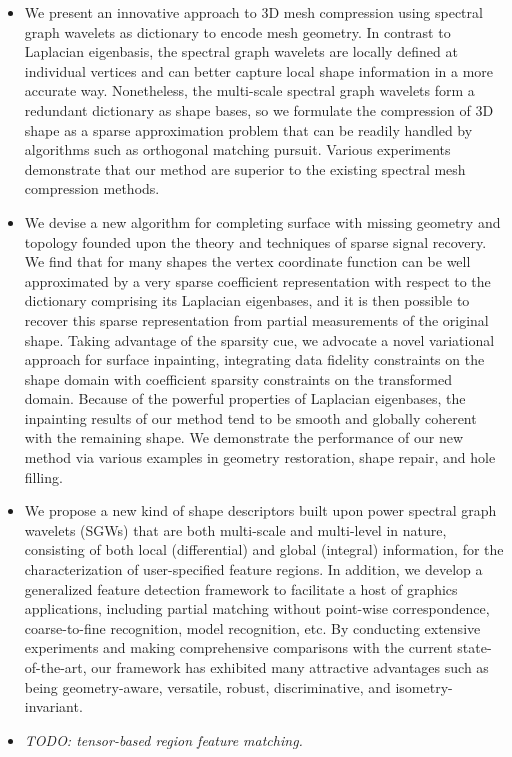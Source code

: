 \begin{itemize}
\item We present an innovative approach to 3D mesh compression using spectral graph
wavelets as dictionary to encode mesh geometry. In contrast to
Laplacian eigenbasis, the spectral graph wavelets are locally
defined at individual vertices and can better capture local shape
information in a more accurate way. Nonetheless, the multi-scale
spectral graph wavelets form a redundant dictionary as shape bases,
so we formulate the compression of 3D shape as a sparse
approximation problem that can be readily handled by
algorithms such as orthogonal matching pursuit. Various experiments
demonstrate that our method are superior to the existing spectral
mesh compression methods.

\item  We devise a new algorithm for completing surface with
  missing geometry and topology founded upon the theory and techniques
  of sparse signal recovery. We find that for many shapes the vertex coordinate function
  can be well approximated by a very sparse coefficient representation with respect
  to the dictionary comprising its Laplacian eigenbases, and it is then possible to
  recover this sparse representation from partial measurements of the original shape.
  Taking advantage of the sparsity cue, we advocate a novel
  variational approach for surface inpainting, integrating data
  fidelity constraints on the shape domain with coefficient sparsity
  constraints on the transformed domain. Because of the powerful
  properties of Laplacian eigenbases, the inpainting results of our
  method tend to be smooth and globally coherent with the remaining
  shape. We demonstrate the performance of our new method via various
  examples in geometry restoration, shape repair, and hole filling.

\item We propose a new kind of shape descriptors built upon
  power spectral graph wavelets (SGWs) that are both multi-scale
  and multi-level in nature, consisting of both local (differential)
  and global (integral) information, for the characterization of
  user-specified feature regions. In addition, we develop a generalized
  feature detection framework to facilitate a host of graphics applications,
  including partial matching without point-wise correspondence, coarse-to-fine
  recognition, model recognition, etc. By conducting extensive
  experiments and making comprehensive comparisons with the current
  state-of-the-art, our framework has exhibited many attractive
  advantages such as being geometry-aware, versatile, robust, discriminative, and isometry-invariant.

\item \emph{TODO: tensor-based region feature matching.}

\end{itemize}

